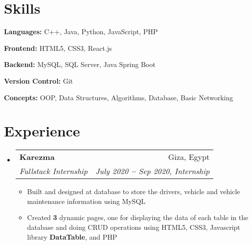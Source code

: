 \documentclass[letterpaper,11pt]{article}
\makeatletter
\newcommand{\resumeItem}[1]{
  \item\small{
    {#1 \vspace{-2pt}}
  }
}
\newcommand{\resumeSubheading}[4]{
  \vspace{-2pt}\item
    \begin{tabular*}{0.97\textwidth}[t]{l@{\extracolsep{\fill}}r}
      \textbf{#1} & #2 \\
      \textit{\small#3} & \textit{\small #4} \\
    \end{tabular*}\vspace{-7pt}
}
\newcommand{\resumeSubHeadingListStart}{\begin{itemize}[leftmargin=0.15in, label={}]}
\newcommand{\resumeSubHeadingListEnd}{\end{itemize}}
\newcommand{\resumeItemListStart}{\begin{itemize}}
\newcommand{\resumeItemListEnd}{\end{itemize}\vspace{-5pt}}
\makeatother
\begin{document}
\section{Skills}
  \vspace{2pt}
  \resumeSubHeadingListStart
    \small{\item{
        
        \textbf{Languages:}{ C++, Java, Python, JavaScript, PHP} \\ \vspace{3pt}
        
        \textbf{Frontend:}{ HTML5, CSS3, React.js} \\ 
        \vspace{3pt}

		\textbf{Backend:}{ MySQL, SQL Server, Java Spring Boot} \\ 
		\vspace{3pt}   
		
		\textbf{Version Control:}{ Git} \\ 
		\vspace{3pt}   
				    
        \textbf{Concepts:}{ OOP, Data Structures, Algorithms, Database, Basic Networking} \\ 
        \vspace{3pt}
        
    }}
  \resumeSubHeadingListEnd




\section{Experience}
  \vspace{3pt}
  \resumeSubHeadingListStart


    \resumeSubheading
      {Karezma}{Giza, Egypt}
      {Fullstack Internship}{July 2020 \textbf{--} Sep 2020, Internship}
        \resumeItemListStart
        	\resumeItem{Built and designed at database to store the drivers, vehicle and vehicle maintenance information using MySQL}
        	\resumeItem{Created \textbf{3} dynamic pages, one for displaying the data of each table in the database and doing CRUD operations using HTML5, CSS3, Javascript library \textbf{DataTable}, and PHP}
        \resumeItemListEnd
  
  \resumeSubHeadingListEnd
\end{document}
